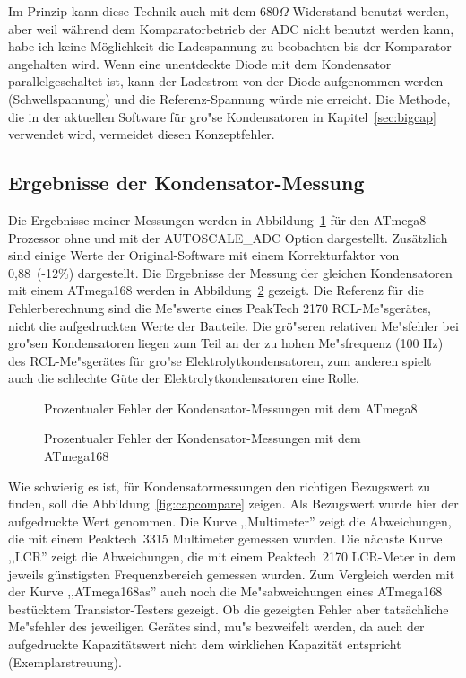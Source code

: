 Im Prinzip kann diese Technik auch mit dem \(680\Omega\) Widerstand benutzt werden,
aber weil w\"ahrend dem Komparatorbetrieb der ADC nicht benutzt werden kann, habe ich keine
M\"oglichkeit die Ladespannung zu beobachten bis der Komparator angehalten wird.
Wenn eine unentdeckte Diode mit dem Kondensator parallelgeschaltet ist, kann der Ladestrom
von der Diode aufgenommen werden (Schwellspannung) und die Referenz-Spannung w\"urde nie erreicht.
Die Methode, die in der aktuellen Software f\"ur gro"se Kondensatoren in Kapitel~\ref{sec:bigcap}
verwendet wird, vermeidet diesen Konzeptfehler.

\subsection{Ergebnisse der Kondensator-Messung}
Die Ergebnisse meiner Messungen werden in Abbildung~\ref{fig:mega8cap} f\"ur den ATmega8 Prozessor ohne und mit
der AUTOSCALE\_ADC Option dargestellt. Zus\"atzlich sind einige Werte der Original-Software mit einem Korrekturfaktor
von 0,88~(-12\%) dargestellt.
Die Ergebnisse der Messung der gleichen Kondensatoren mit einem ATmega168 werden in Abbildung~\ref{fig:mega168cap} gezeigt.
Die Referenz f\"ur die Fehlerberechnung sind die Me"swerte eines PeakTech 2170 RCL-Me"sger\"ates, 
 nicht die aufgedruckten Werte der Bauteile.
Die gr\"o"seren relativen Me"sfehler bei gro"sen Kondensatoren liegen zum Teil an der zu hohen Me"sfrequenz (100 Hz) des
RCL-Me"sger\"ates f\"ur gro"se Elektrolytkondensatoren, zum anderen spielt auch die schlechte G\"ute der
Elektrolytkondensatoren eine Rolle.

\begin{figure}[H]
\centering

\caption{Prozentualer Fehler der Kondensator-Messungen mit dem ATmega8}
\label{fig:mega8cap}
\end{figure}

\begin{figure}[H]
\centering

\caption{Prozentualer Fehler der Kondensator-Messungen mit dem ATmega168}
\label{fig:mega168cap}
\end{figure}

Wie schwierig es ist, f\"ur Kondensatormessungen den richtigen Bezugswert zu finden, soll die Abbildung~\ref{fig:capcompare} zeigen.
Als Bezugswert wurde hier der aufgedruckte Wert genommen. Die Kurve ,,Multimeter'' zeigt die Abweichungen, die mit einem
Peaktech~3315 Multimeter gemessen wurden.
Die n\"achste Kurve ,,LCR'' zeigt die Abweichungen, die mit einem Peaktech~2170 LCR-Meter in dem jeweils g\"unstigsten Frequenzbereich gemessen wurden.
Zum Vergleich werden mit der Kurve ,,ATmega168as'' auch noch die Me"sabweichungen eines ATmega168 best\"ucktem Transistor-Testers gezeigt.
Ob die gezeigten Fehler aber tats\"achliche Me"sfehler des jeweiligen Ger\"ates sind, mu"s bezweifelt werden, da auch der
aufgedruckte Kapazit\"atswert nicht dem wirklichen Kapazit\"at entspricht (Exemplarstreuung).

